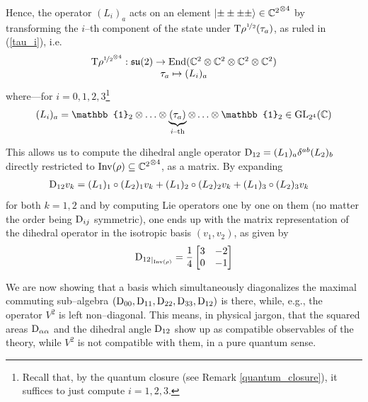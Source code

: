Hence, the operator $(L_i)_a$ acts on an element $\left| \pm\pm\pm\pm \right >\in{\mathbb{C}^2}^{\otimes 4}$ by transforming the $i$--th component of the state under $\text{\normalfont T}\rho^{\nicefrac{1}{2}}(\tau_a)$, as ruled in (\ref{tau_i}), i.e.
$$\begin{matrix}
    \text{\normalfont T}\rho^{{\nicefrac{1}{2}}^{\otimes 4}}:\mathfrak{su}(2)\to\text{\normalfont End}({\mathbb{C}^2}\otimes{\mathbb{C}^2}\otimes{\mathbb{C}^2}\otimes{\mathbb{C}^2})\\
    \tau_a\mapsto (L_i)_a
\end{matrix}$$
where---for $i=0,1,2,3$\footnote{Recall that, by the quantum closure (see Remark \ref{quantum_closure}), it suffices to just compute $i=1,2,3$.}
$$(L_i)_a=\mathbb{1}_2\otimes\hdots\otimes\underbrace{(\tau_a)}_{i\text{--th}}\otimes\hdots\otimes\mathbb{1}_2\in\GL_{2^4}(\C)$$


This allows us to compute the dihedral angle operator $\text{\normalfont D}_{12}=(L_1)_a\delta^{ab}(L_2)_b$ directly restricted to $\text{\normalfont Inv}(\rho)\subseteq{\mathbb{C}^2}^{\otimes 4}$, as a matrix. By expanding
\begin{align*}
    \text{\normalfont D}_{12}v_k&=(L_1)_1\circ(L_2)_1v_k+(L_1)_2\circ(L_2)_2v_k+(L_1)_3\circ(L_2)_3v_k
\end{align*}
for both $k=1,2$ and by computing Lie operators one by one on them (no matter the order being $\text{\normalfont D}_{ij}$ symmetric), one ends up with the matrix representation of the dihedral operator in the isotropic basis $(v_1,v_2)$, as given by
$${\text{\normalfont D}_{12}}_{|_{\text{\normalfont Inv}(\rho)}}=\frac{1}{4}\begin{bmatrix}
    3&-2\\
    0&-1
\end{bmatrix}$$

We are now showing that a basis which simultaneously diagonalizes the maximal commuting sub--algebra $(\text{\normalfont D}_{00},\text{\normalfont D}_{11},\text{\normalfont D}_{22},\text{\normalfont D}_{33},\text{\normalfont D}_{12})$ is there, while, e.g., the operator $V^2$ is left non--diagonal. This means, in physical jargon, that the squared areas $\text{\normalfont D}_{\alpha\alpha}$ and the dihedral angle $\text{\normalfont D}_{12}$ show up as compatible observables of the theory, while $V^2$ is not compatible with them, in a pure quantum sense.

